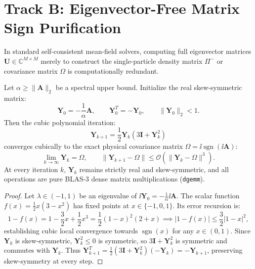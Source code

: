 

\section{Track B: Eigenvector-Free Matrix Sign Purification}
\label{sec:m1_8_matrix_sign_purification}

In standard self-consistent mean-field solvers, computing full eigenvector matrices $\mathbf{U} \in \mathbb{C}^{M \times M}$ merely to construct the single-particle density matrix $\Pi^-$ or covariance matrix $\Omega$ is computationally redundant.

\begin{theorem}
\label{thm:m1_8_newton_schulz}
Let $\alpha \ge \|\mathbf{A}\|_2$ be a spectral upper bound. Initialize the real skew-symmetric matrix:
\begin{equation}
\label{eq:m1_8_purif_init}
\mathbf{Y}_0 = -\frac{1}{\alpha} \mathbf{A}, \qquad \mathbf{Y}_0^T = -\mathbf{Y}_0, \qquad \|\mathbf{Y}_0\|_2 < 1.
\end{equation}
Then the cubic polynomial iteration:
\begin{equation}
\label{eq:m1_8_newton_schulz_step}
\mathbf{Y}_{k+1} = \frac{1}{2} \mathbf{Y}_k \left( 3 \mathbf{I} + \mathbf{Y}_k^2 \right)
\end{equation}
converges cubically to the exact physical covariance matrix $\Omega = \ii \operatorname{sgn}(\ii \mathbf{A})$:
\begin{equation}
\lim_{k \to \infty} \mathbf{Y}_k = \Omega, \qquad \|\mathbf{Y}_{k+1} - \Omega\| \le \mathcal{O}\left( \|\mathbf{Y}_k - \Omega\|^3 \right).
\end{equation}
At every iteration $k$, $\mathbf{Y}_k$ remains strictly real and skew-symmetric, and all operations are pure BLAS-3 dense matrix multiplications (\texttt{dgemm}).
\end{theorem}
\begin{proof}
Let $\lambda \in (-1, 1)$ be an eigenvalue of $\ii \mathbf{Y}_0 = -\frac{1}{\alpha} \ii \mathbf{A}$. The scalar function $f(x) = \frac{1}{2} x (3 - x^2)$ has fixed points at $x \in \{-1, 0, 1\}$. Its error recursion is:
\begin{equation}
1 - f(x) = 1 - \frac{3}{2}x + \frac{1}{2}x^3 = \frac{1}{2}(1-x)^2 (2+x) \implies |1 - f(x)| \le \frac{3}{2} |1-x|^2,
\end{equation}
establishing cubic local convergence towards $\operatorname{sgn}(x)$ for any $x \in (0, 1)$. Since $\mathbf{Y}_k$ is skew-symmetric, $\mathbf{Y}_k^2 \le 0$ is symmetric, so $3\mathbf{I} + \mathbf{Y}_k^2$ is symmetric and commutes with $\mathbf{Y}_k$. Thus $\mathbf{Y}_{k+1}^T = \frac{1}{2} (3\mathbf{I} + \mathbf{Y}_k^2) (-\mathbf{Y}_k) = -\mathbf{Y}_{k+1}$, preserving skew-symmetry at every step.
\end{proof}

